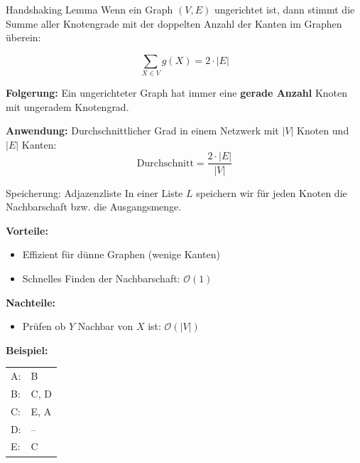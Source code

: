 \documentclass[a4paper, fontsize=7pt]{scrartcl}
\begin{document}
\begin{mainbox}{Handshaking Lemma}
Wenn ein Graph $(V, E)$ ungerichtet ist, dann stimmt die Summe aller Knotengrade mit der doppelten Anzahl der Kanten im Graphen \"uberein:

$$\sum_{X \in V} g(X) = 2 \cdot |E|$$

\textbf{Folgerung:}
Ein ungerichteter Graph hat immer eine \textbf{gerade Anzahl} Knoten mit ungeradem Knotengrad.

\textbf{Anwendung:}
Durchschnittlicher Grad in einem Netzwerk mit $|V|$ Knoten und $|E|$ Kanten:
$$\text{Durchschnitt} = \frac{2 \cdot |E|}{|V|}$$
\end{mainbox}

\begin{mainbox}{Speicherung: Adjazenzliste}
In einer Liste $L$ speichern wir f\"ur jeden Knoten die Nachbarschaft bzw. die Ausgangsmenge.

\textbf{Vorteile:}
\begin{itemize}
    \item Effizient f\"ur d\"unne Graphen (wenige Kanten)
    \item Schnelles Finden der Nachbarschaft: $\mathcal{O}(1)$
\end{itemize}

\textbf{Nachteile:}
\begin{itemize}
    \item Pr\"ufen ob $Y$ Nachbar von $X$ ist: $\mathcal{O}(|V|)$
\end{itemize}

\textbf{Beispiel:}
\begin{center}
\begin{tabular}{ll}
A: & B \\
B: & C, D \\
C: & E, A \\
D: & -- \\
E: & C
\end{tabular}
\end{center}
\end{mainbox}
\end{document}
